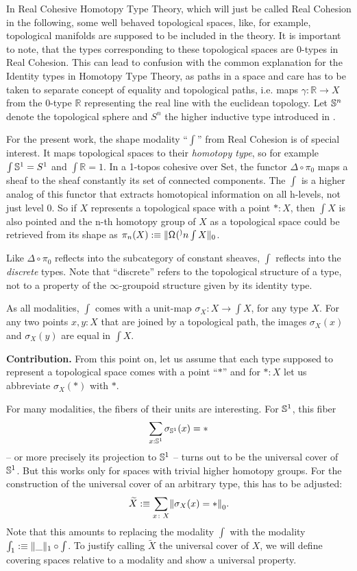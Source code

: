 \documentclass[9pt,twosided]{amsart}
\newcommand{\shape}{\int}
\newcommand{\RR}{\mathbb R}
\begin{document}
In Real Cohesive Homotopy Type Theory,
which will just be called Real Cohesion in the following, 
some well behaved topological spaces, like, for example, topological manifolds
are supposed to be included in the theory.
It is important to note, that the types corresponding to these topological spaces
are 0-types in Real Cohesion.
This can lead to confusion with the common explanation for the Identity types in Homotopy Type Theory,
as paths in a space and care has to be taken to separate concept of equality
and topological paths, i.e. maps $\gamma:\RR\to X$ from the 0-type $\RR$ representing the real line with the euclidean topology.
Let $\mathbb{S}^{n}$ denote the topological sphere and $S^n$ the higher inductive type 
introduced in \cite{UFP}.

For the present work, the shape modality ``$\shape$'' from Real Cohesion is of special interest.
It maps topological spaces to their \emph{homotopy type}, so for example $\shape \sphere{1} =S^1$ 
and $\shape \RR =1$. 
In a 1-topos cohesive over Set, the functor $\Delta\circ\pi_0$ maps a sheaf to the sheaf constantly its set of connected components.
The $\shape$ is a higher analog of this functor that extracts homotopical information on all h-levels, not just level 0.
So if $X$ represents a topological space with a point $\ast: X$, 
then $\shape X$ is also pointed and the n-th homotopy group of $X$ as a topological space 
could be retrieved from its shape 
as $\pi_n(X):\equiv\trunc{0}{\loopspace^n\shape X}$.

Like $\Delta\circ\pi_0$ reflects into the subcategory of constant sheaves, $\shape$ reflects into the \emph{discrete} types.
Note that ``discrete'' refers to the topological structure of a type, 
not to a property of the $\infty$-groupoid structure given by its identity type.

As all modalities, $\shape$ comes with a unit-map $\sigma_X\colon X \to \shape X$, for any type $X$.
For any two points $x,y: X$ that are joined by a topological path, 
the images $\sigma_X(x)$ and $\sigma_X(y)$ are equal in $\shape X$.

\vspace{1cm}

\textbf{Contribution.} From this point on, 
let us assume that each type supposed to represent a topological space comes with a point ``$\ast$''
and for $\ast:X$ let us abbreviate $\sigma_X(\ast)$ with $\ast$.
  
For many modalities, the fibers of their units are interesting.
For $\mathbb{S}^{1}$, this fiber
\[ \sum_{x:\mathbb{S}^{1}}\sigma_{\mathbb{S}^{1}}(x)=\ast \]
-- or more precisely its projection to $\mathbb{S}^{1}$ -- turns out to be the universal cover of $\mathbb{S}^{1}$.
But this works only for spaces with trivial higher homotopy groups. 
For the construction of the universal cover of an arbitrary type, this has to be adjusted:
\[ \widetilde{X}:\equiv \sum_{x\colon X} \trunc{0}{\sigma_X(x)=\ast}. \]
Note that this amounts to replacing the modality $\shape$ with the modality $\shape_1:\equiv\trunc{1}{\_}\circ\shape$.
To justify calling $\widetilde{X}$ the universal cover of $X$, 
we will define covering spaces relative to a modality and show a universal property.
    
\end{document}
